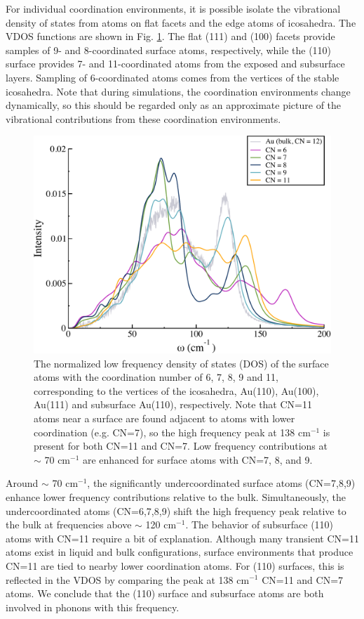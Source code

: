 \documentclass[journal = jpccck, manuscript = suppinfo]{achemso}
\begin{document}
For individual coordination environments, it is possible isolate the
vibrational density of states from atoms on flat facets and the edge
atoms of icosahedra. The VDOS functions are shown in
Fig. \ref{fig:cn-spect}. The flat (111) and (100) facets provide
samples of 9- and 8-coordinated surface atoms, respectively, while the
(110) surface provides 7- and 11-coordinated atoms from the exposed
and subsurface layers. Sampling of 6-coordinated atoms comes from the
vertices of the stable icosahedra.  Note that during simulations, the
coordination environments change dynamically, so this should be
regarded only as an approximate picture of the vibrational
contributions from these coordination environments.

\begin{figure}[!htb]
  \includegraphics[width=5in]{figures/surface-cn.pdf}
  \caption{The normalized low frequency density of states (DOS) of the
    surface atoms with the coordination number of 6, 7, 8, 9 and 11,
    corresponding to the vertices of the icosahedra, Au(110), Au(100),
    Au(111) and subsurface Au(110), respectively.  Note that CN=11
    atoms near a surface are found adjacent to atoms with lower
    coordination (e.g. CN=7), so the high frequency peak at 138
    cm$^{-1}$ is present for both CN=11 and CN=7.  Low frequency
    contributions at $\sim$ 70 cm$^{-1}$ are enhanced for surface
    atoms with CN=7, 8, and 9.}
  \label{fig:cn-spect}
\end{figure}

Around $\sim$ 70 cm$^{-1}$, the significantly undercoordinated surface
atoms (CN=7,8,9) enhance lower frequency contributions relative to the
bulk.  Simultaneously, the undercoordinated atoms (CN=6,7,8,9) shift
the high frequency peak relative to the bulk at frequencies above
$\sim$ 120 cm$^{-1}$.  The behavior of subsurface (110) atoms with
CN=11 require a bit of explanation. Although many transient CN=11
atoms exist in liquid and bulk configurations, surface environments
that produce CN=11 are tied to nearby lower coordination atoms.  For
(110) surfaces, this is reflected in the VDOS by comparing the peak at
138 cm$^{-1}$ CN=11 and CN=7 atoms.  We conclude that the (110)
surface and subsurface atoms are both involved in phonons with this
frequency.
\end{document}
